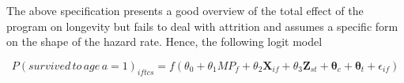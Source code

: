 The above specification presents a good overview of the total effect of the program on longevity but fails to deal with attrition and assumes a specific form on the shape of the hazard rate. Hence, the following logit model 

$$
P(survived\,to\,age\,a=1)_{iftcs} = f(\theta_0 + \theta_1MP_f + \theta_2\mathbf{X}_{if} + \theta_3\mathbf{Z}_{st} + \mathbf{\theta}_c + \mathbf{\theta}_t + \epsilon_{if})
$$